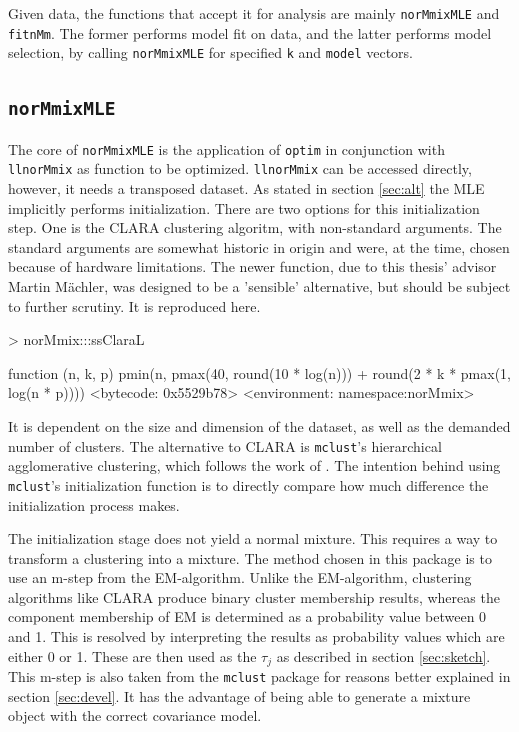 Given data, the functions that accept it for analysis are mainly 
{\tt norMmixMLE} and {\tt fitnMm}. The former performs model fit on data, and 
the latter performs model selection, by calling {\tt norMmixMLE} for specified
{\tt k} and {\tt model} vectors. 

\subsection{{\tt norMmixMLE}}

The core of {\tt norMmixMLE} is the application of {\tt optim} in conjunction
with {\tt llnorMmix} as function to be optimized. {\tt llnorMmix} can be 
accessed directly, however, it needs a transposed dataset.
As stated in section \ref{sec:alt} the MLE implicitly performs initialization.
There are two options for this initialization step. One is the CLARA clustering
algoritm, with non-standard arguments. The standard arguments are somewhat 
historic in origin and were, at the time, chosen because of hardware 
limitations. The newer function, due to this thesis' advisor Martin M\"achler, 
was designed to be a 'sensible' alternative, but should be subject to further 
scrutiny. It is reproduced here.

\begin{Schunk}
\begin{Sinput}
>     norMmix:::ssClaraL
\end{Sinput}
\begin{Soutput}
function (n, k, p) 
pmin(n, pmax(40, round(10 * log(n))) + round(2 * k * pmax(1, 
    log(n * p))))
<bytecode: 0x5529b78>
<environment: namespace:norMmix>
\end{Soutput}
\end{Schunk}

It is dependent on the size and dimension of the dataset, as well as the 
demanded number of clusters.
The alternative to CLARA is {\tt mclust}'s hierarchical agglomerative 
clustering, which follows the work of \cite{Fra98}. The intention behind using 
{\tt mclust}'s initialization function is to directly compare how much 
difference the initialization process makes.

The initialization stage does not yield a normal mixture. This requires a way
to transform a clustering into a mixture. The method chosen in this package is
to use an m-step from the EM-algorithm. Unlike the EM-algorithm, clustering 
algorithms like CLARA produce binary cluster membership results, whereas the 
component membership of EM is determined as a probability value between 0 and 1.
This is resolved by interpreting the results as probability values which are 
either 0 or 1. These are then used as the $\tau_j$ as described in section 
\ref{sec:sketch}. This m-step is also taken from the {\tt mclust} package for 
reasons better explained in section \ref{sec:devel}.
It has the advantage of being able to generate a mixture object with the 
correct covariance model.

